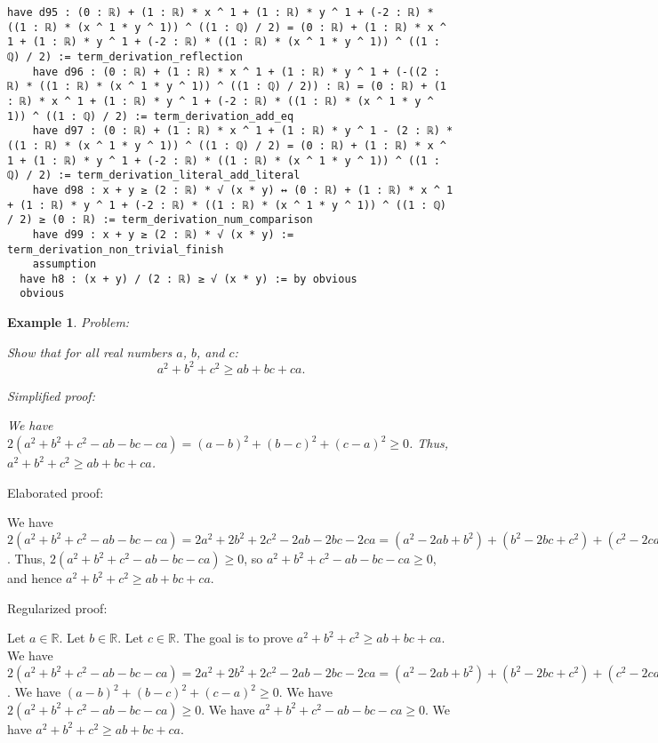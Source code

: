 \documentclass{article}
\newtheorem{example}{Example}
\begin{document}
\begin{tcolorbox}[colback=white!10, width=\linewidth]
\begin{lstlisting}[language=Lean4]
    have d95 : (0 : ℝ) + (1 : ℝ) * x ^ 1 + (1 : ℝ) * y ^ 1 + (-2 : ℝ) * ((1 : ℝ) * (x ^ 1 * y ^ 1)) ^ ((1 : ℚ) / 2) = (0 : ℝ) + (1 : ℝ) * x ^ 1 + (1 : ℝ) * y ^ 1 + (-2 : ℝ) * ((1 : ℝ) * (x ^ 1 * y ^ 1)) ^ ((1 : ℚ) / 2) := term_derivation_reflection
    have d96 : (0 : ℝ) + (1 : ℝ) * x ^ 1 + (1 : ℝ) * y ^ 1 + (-((2 : ℝ) * ((1 : ℝ) * (x ^ 1 * y ^ 1)) ^ ((1 : ℚ) / 2)) : ℝ) = (0 : ℝ) + (1 : ℝ) * x ^ 1 + (1 : ℝ) * y ^ 1 + (-2 : ℝ) * ((1 : ℝ) * (x ^ 1 * y ^ 1)) ^ ((1 : ℚ) / 2) := term_derivation_add_eq
    have d97 : (0 : ℝ) + (1 : ℝ) * x ^ 1 + (1 : ℝ) * y ^ 1 - (2 : ℝ) * ((1 : ℝ) * (x ^ 1 * y ^ 1)) ^ ((1 : ℚ) / 2) = (0 : ℝ) + (1 : ℝ) * x ^ 1 + (1 : ℝ) * y ^ 1 + (-2 : ℝ) * ((1 : ℝ) * (x ^ 1 * y ^ 1)) ^ ((1 : ℚ) / 2) := term_derivation_literal_add_literal
    have d98 : x + y ≥ (2 : ℝ) * √ (x * y) ↔ (0 : ℝ) + (1 : ℝ) * x ^ 1 + (1 : ℝ) * y ^ 1 + (-2 : ℝ) * ((1 : ℝ) * (x ^ 1 * y ^ 1)) ^ ((1 : ℚ) / 2) ≥ (0 : ℝ) := term_derivation_num_comparison
    have d99 : x + y ≥ (2 : ℝ) * √ (x * y) := term_derivation_non_trivial_finish
    assumption
  have h8 : (x + y) / (2 : ℝ) ≥ √ (x * y) := by obvious
  obvious

\end{lstlisting}
\end{tcolorbox}


\begin{example}
Problem:
\begin{tcolorbox}[colback=yellow!10, width=\linewidth]
Show that for all real numbers $a$, $b$, and $c$:
    $$a^2 + b^2 + c^2 \geq ab + bc + ca.$$
\end{tcolorbox}

Simplified proof:
\begin{tcolorbox}[colback=blue!10, width=\linewidth]
We have $2(a^2 + b^2 + c^2 - ab - bc - ca) = (a-b)^2 + (b-c)^2 + (c-a)^2 \ge 0$. Thus, $a^2 + b^2 + c^2 \geq ab + bc + ca$.
\end{tcolorbox}
\end{example}

Elaborated proof:
\begin{tcolorbox}[colback=green!10, width=\linewidth]
We have $2(a^2 + b^2 + c^2 - ab - bc - ca) = 2a^2 + 2b^2 + 2c^2 - 2ab - 2bc - 2ca = (a^2 - 2ab + b^2) + (b^2 - 2bc + c^2) + (c^2 - 2ca + a^2) = (a-b)^2 + (b-c)^2 + (c-a)^2 \ge 0$. Thus, $2(a^2 + b^2 + c^2 - ab - bc - ca) \ge 0$, so $a^2 + b^2 + c^2 - ab - bc - ca \ge 0$, and hence $a^2 + b^2 + c^2 \geq ab + bc + ca$.
\end{tcolorbox}

Regularized proof:
\begin{tcolorbox}[colback=red!10, width=\linewidth]
Let $a\in\mathbb{R}$.
Let $b\in\mathbb{R}$.
Let $c\in\mathbb{R}$.
The goal is to prove $a^2 + b^2 + c^2 \geq ab + bc + ca$.
We have $2(a^2 + b^2 + c^2 - ab - bc - ca) = 2a^2 + 2b^2 + 2c^2 - 2ab - 2bc - 2ca = (a^2 - 2ab + b^2) + (b^2 - 2bc + c^2) + (c^2 - 2ca + a^2) = {(a-b)}^2 + {(b-c)}^2 + {(c-a)}^2$.
We have ${(a-b)}^2 + {(b-c)}^2 + {(c-a)}^2 \ge 0$.
We have $2(a^2 + b^2 + c^2 - ab - bc - ca) \ge 0$.
We have $a^2 + b^2 + c^2 - ab - bc - ca \ge 0$.
We have $a^2 + b^2 + c^2 \geq ab + bc + ca$.
\end{tcolorbox}
\end{document}
